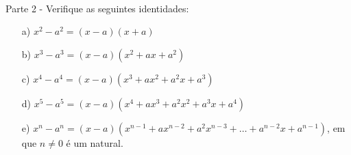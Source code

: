 \documentclass[exercícios_de_cálculo.tex]{subfiles}
\begin{document}
\newpage

\paragraph{}Parte 2 - Verifique as seguintes identidades:
\begin{itemize}
	\item[a)] \(x^{2} - a^{2} = (x-a)(x+a)\)
	\item[b)] \(x^{3} - a^{3} = (x-a)(x^{2}+ax+a^{2})\)
	\item[c)] \(x^{4} - a^{4} = (x-a)(x^{3}+ax^{2}+a^{2}x+a^{3})\)
	\item[d)] \(x^{5} - a^{5} = (x-a)(x^{4} + ax^{3} + a^{2}x^{2} + a^{3}x + a^{4})\)
	\item[e)] \(x^{n}-a^{n} = (x-a)(x^{n-1} + ax^{n-2} + a^{2}x^{n-3} + \dotsc + a^{n-2}x + a^{n-1})\), em que \(n\neq0\) é um natural.
\end{itemize}
\end{document}
